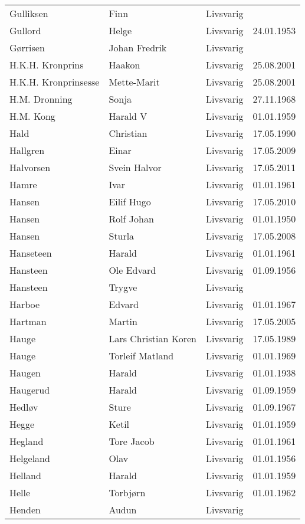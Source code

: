 \begin{longtable}{llll}
Gulliksen	&	Finn	&	Livsvarig 	&		\\
Gullord	&	Helge	&	Livsvarig 	&	24.01.1953	\\
Gørrisen	&	Johan Fredrik	&	Livsvarig 	&		\\
H.K.H. Kronprins	&	Haakon 	&	Livsvarig	&	25.08.2001	\\
H.K.H. Kronprinsesse	&	Mette-Marit 	&	Livsvarig	&	25.08.2001	\\
H.M. Dronning	&	Sonja	&	Livsvarig 	&	27.11.1968	\\
H.M. Kong	&	Harald V	&	Livsvarig 	&	01.01.1959	\\
Hald	&	Christian	&	Livsvarig 	&	17.05.1990	\\
Hallgren	&	Einar	&	Livsvarig	&	17.05.2009	\\
Halvorsen	&	Svein Halvor	&	Livsvarig	&	17.05.2011	\\
Hamre	&	Ivar	&	Livsvarig 	&	01.01.1961	\\
Hansen	&	Eilif Hugo	&	Livsvarig	&	17.05.2010	\\
Hansen	&	Rolf Johan	&	Livsvarig 	&	01.01.1950	\\
Hansen	&	Sturla	&	Livsvarig	&	17.05.2008	\\
Hanseteen	&	Harald	&	Livsvarig 	&	01.01.1961	\\
Hansteen	&	Ole Edvard	&	Livsvarig 	&	01.09.1956	\\
Hansteen	&	Trygve	&	Livsvarig 	&		\\
Harboe	&	Edvard	&	Livsvarig 	&	01.01.1967	\\
Hartman 	&	Martin	&	Livsvarig	&	17.05.2005	\\
Hauge	&	Lars Christian Koren	&	Livsvarig 	&	17.05.1989	\\
Hauge	&	Torleif Matland	&	Livsvarig 	&	01.01.1969	\\
Haugen	&	Harald	&	Livsvarig 	&	01.01.1938	\\
Haugerud	&	Harald	&	Livsvarig 	&	01.09.1959	\\
Hedløv	&	Sture	&	Livsvarig 	&	01.09.1967	\\
Hegge	&	Ketil	&	Livsvarig 	&	01.01.1959	\\
Hegland	&	Tore Jacob	&	Livsvarig 	&	01.01.1961	\\
Helgeland	&	Olav	&	Livsvarig 	&	01.01.1956	\\
Helland	&	Harald	&	Livsvarig 	&	01.01.1959	\\
Helle	&	Torbjørn	&	Livsvarig 	&	01.01.1962	\\
Henden	&	Audun	&	Livsvarig 	&		\\

\end{longtable}
